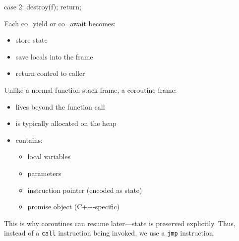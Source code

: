 \documentclass{report}
\begin{document}
\begin{itemize}
\begin{cppcode}
{{                            case 2:
                            destroy(f);
                            return;
                        }
                    }
                \end{cppcode}
                \bigbreak \noindent 
                Each co\_yield or co\_await becomes:
                \begin{itemize}
                    \item store state
                    \item save locals into the frame
                    \item return control to caller 
                \end{itemize}
                Unlike a normal function stack frame, a coroutine frame:
                \begin{itemize}
                    \item lives beyond the function call
                    \item is typically allocated on the heap
                    \item contains:
                    \begin{itemize}
                        \item local variables
                        \item parameters
                        \item instruction pointer (encoded as state)
                        \item promise object (C++-specific)
                    \end{itemize}
            \end{itemize}
            This is why coroutines can resume later—state is preserved explicitly. Thus, instead of a \texttt{call} instruction being invoked, we use a \texttt{jmp} instruction.

        \end{itemize}







    
\end{document}
